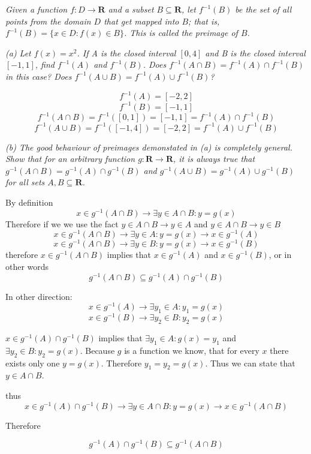 \documentclass[11pt,oneside,titlepage]{article}
\begin{document}
\textit{Given a function $f: D \to \textbf{R}$ and a subset $B \subseteq \textbf{R}$, let $f^{-1}(B)$ be the set of all points from the domain $D$ that get mapped into $B$; that is, $f^{-1}(B) = \{x \in D: f(x) \in B\}$. This is called
  the preimage of $B$.}

\textit{(a) Let $f(x) = x^2$. If A is the closed interval $[0,4]$ and B is the
  closed interval $[-1, 1]$, find $f^{-1}(A)$ and $f^{-1}(B)$. Does
  $f^{-1}(A \cap B) = f^{-1}(A) \cap f^{-1}(B)$ in this case? Does
  $f^{-1}(A \cup B) = f^{-1}(A) \cup f^{-1}(B)$?
}

$$f^{-1}(A) = [-2, 2]$$
$$f^{-1}(B) = [-1, 1]$$
$$f^{-1}(A \cap B) = f^{-1}([0, 1]) = [-1, 1] = f^{-1}(A) \cap f^{-1}(B)$$
$$f^{-1}(A \cup B) = f^{-1}([-1, 4]) = [-2, 2] = f^{-1}(A) \cup f^{-1}(B)$$

\textit{(b) The good behaviour of preimages demonstated in (a) is completely
  general. Show that for an arbitrary function $g: \textbf{R} \to \textbf{R}$,
  it is always true that $g^{-1}(A \cap B) = g^{-1}(A) \cap g^{-1}(B)$ and
  $g^{-1}(A \cup B) = g^{-1}(A) \cup g^{-1}(B)$ for all sets $A, B \subseteq \textbf{R}$.
}

By definition
$$ x \in g^{-1}(A \cap B) \to \exists y \in A \cap B: y = g(x)$$
Therefore if we we use the fact  $y \in A \cap B \to y \in A$ and $y \in A \cap B \to y \in B$
$$ x \in g^{-1}(A \cap B) \to \exists y \in A: y = g(x) \to x \in g^{-1}(A)$$
$$ x \in g^{-1}(A \cap B) \to \exists y \in B: y = g(x) \to x \in g^{-1}(B)$$
therefore $x \in g^{-1}(A \cap B)$ implies that $x \in g^{-1}(A)$ and $x \in g^{-1}(B)$, or in other words
$$g^{-1}(A \cap B) \subseteq g^{-1}(A) \cap g^{-1}(B)$$

In other direction: 
$$x \in g^{-1}(A) \to \exists y_1 \in A: y_1 = g(x)$$
$$x \in g^{-1}(B) \to \exists y_2 \in B: y_2 = g(x)$$

$x \in g^{-1}(A) \cap g^{-1}(B)$ implies that $ \exists y_1 \in A: g(x) = y_1$ and $\exists y_2 \in B: y_2 = g(x)$. Because $g$ is a function we know, that
for every $x$ there exists only one $y = g(x)$. Therefore $y_1 = y_2 = g(x)$.
Thus we can state that $y \in A \cap B$.

thus
$$x \in g^{-1}(A) \cap g^{-1}(B) \to \exists y \in A \cap B: y = g(x) \to
x \in g^{-1}(A \cap B)$$

Therefore 

$$ g^{-1}(A) \cap g^{-1}(B) \subseteq   g^{-1}(A \cap B)$$
\end{document}
